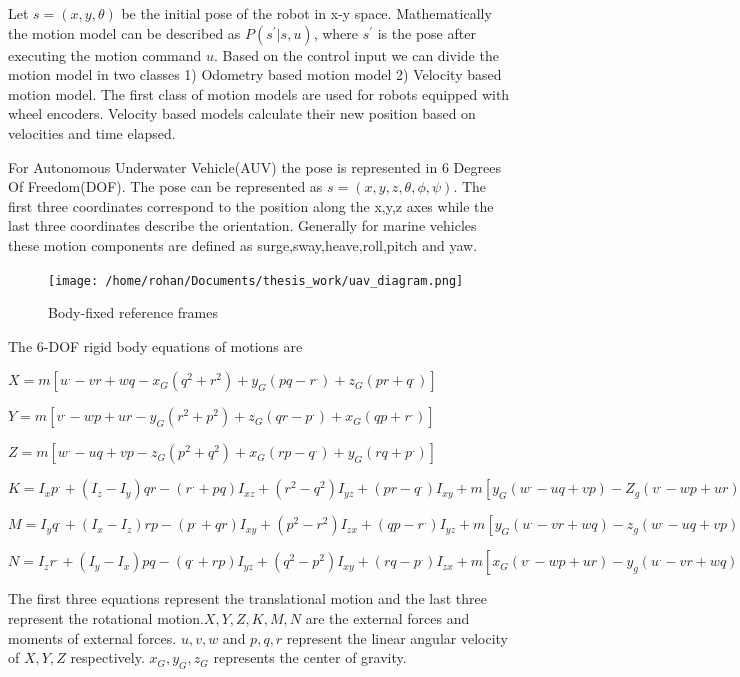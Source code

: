 \documentclass[12pt]{dalcsthesis}
\begin{document}
Let $s=(x,y,\theta)$ be the initial pose of the robot in x-y space.
Mathematically the motion model can be described as $P(s^{'}|s,u)$,
where $s^{'}$ is the pose after executing the motion command $u$.
Based on the control input we can divide the motion model in two classes
1) Odometry based motion model 2) Velocity based motion model. The
first class of motion models are used for robots equipped with wheel
encoders. Velocity based models calculate their new position based
on velocities and time elapsed.

For Autonomous Underwater Vehicle(AUV) the pose is represented in
6 Degrees Of Freedom(DOF). The pose can be represented as $s=(x,y,z,\theta,\phi,\psi)$.
The first three coordinates correspond to the position along the x,y,z
axes while the last three coordinates describe the orientation. Generally
for marine vehicles these motion components are defined as surge,sway,heave,roll,pitch
and yaw. 

\begin{figure}
\caption{Body-fixed reference frames}


\texttt{[image: /home/rohan/Documents/thesis\_work/uav\_diagram.png]}

\end{figure}


The 6-DOF rigid body equations of motions are 

$X=m[u^{.}-vr+wq-x_{G}(q^{2}+r^{2})+y_{G}(pq-r^{.})+z_{G}(pr+q^{.})]$


$Y=m[v^{.}-wp+ur-y_{G}(r^{2}+p^{2})+z_{G}(qr-p^{.})+x_{G}(qp+r^{.})]$

$Z=m[w^{.}-uq+vp-z_{G}(p^{2}+q^{2})+x_{G}(rp-q^{.})+y_{G}(rq+p^{.})]$

$K=I_{x}p^{.}+(I_{z}-I_{y})qr-(r^{.}+pq)I_{xz}+(r^{2}-q^{2})I_{yz}+(pr-q^{.})I_{xy}+m[y_{G}(w^{.}-uq+vp)-Z_{g}(v^{.}-wp+ur)]$

$M=I_{y}q^{.}+(I_{x}-I_{z})rp-(p^{.}+qr)I_{xy}+(p^{2}-r^{2})I_{zx}+(qp-r^{.})I_{yz}+m[y_{G}(u^{.}-vr+wq)-z_{g}(w^{.}-uq+vp)]$

$N=I_{z}r^{.}+(I_{y}-I_{x})pq-(q^{.}+rp)I_{yz}+(q^{2}-p^{2})I_{xy}+(rq-p^{.})I_{zx}+m[x_{G}(v^{.}-wp+ur)-y_{g}(u^{.}-vr+wq)]$

The first three equations represent the translational motion and the
last three represent the rotational motion.$X,Y,Z,K,M,N$ are the
external forces and moments of external forces. $u,v,w$ and $p,q,r$
represent the linear angular velocity of $X,Y,Z$ respectively. $x_{G},y_{G},z_{G}$
represents the center of gravity.
\end{document}
